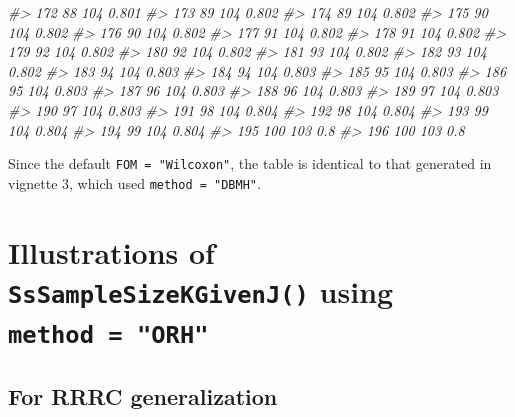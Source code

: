 \documentclass[
]{book}
\newenvironment{Shaded}{\begin{snugshade}}{\end{snugshade}}
\newcommand{\CommentTok}[1]{\textcolor[rgb]{0.56,0.35,0.01}{\textit{#1}}}
\begin{document}
\begin{Shaded}
\begin{Highlighting}[]
\CommentTok{\#\textgreater{} 172         88      104 0.801}
\CommentTok{\#\textgreater{} 173         89      104 0.802}
\CommentTok{\#\textgreater{} 174         89      104 0.802}
\CommentTok{\#\textgreater{} 175         90      104 0.802}
\CommentTok{\#\textgreater{} 176         90      104 0.802}
\CommentTok{\#\textgreater{} 177         91      104 0.802}
\CommentTok{\#\textgreater{} 178         91      104 0.802}
\CommentTok{\#\textgreater{} 179         92      104 0.802}
\CommentTok{\#\textgreater{} 180         92      104 0.802}
\CommentTok{\#\textgreater{} 181         93      104 0.802}
\CommentTok{\#\textgreater{} 182         93      104 0.802}
\CommentTok{\#\textgreater{} 183         94      104 0.803}
\CommentTok{\#\textgreater{} 184         94      104 0.803}
\CommentTok{\#\textgreater{} 185         95      104 0.803}
\CommentTok{\#\textgreater{} 186         95      104 0.803}
\CommentTok{\#\textgreater{} 187         96      104 0.803}
\CommentTok{\#\textgreater{} 188         96      104 0.803}
\CommentTok{\#\textgreater{} 189         97      104 0.803}
\CommentTok{\#\textgreater{} 190         97      104 0.803}
\CommentTok{\#\textgreater{} 191         98      104 0.804}
\CommentTok{\#\textgreater{} 192         98      104 0.804}
\CommentTok{\#\textgreater{} 193         99      104 0.804}
\CommentTok{\#\textgreater{} 194         99      104 0.804}
\CommentTok{\#\textgreater{} 195        100      103   0.8}
\CommentTok{\#\textgreater{} 196        100      103   0.8}
\end{Highlighting}
\end{Shaded}

Since the default \texttt{FOM\ =\ "Wilcoxon"}, the table is identical to that generated in vignette 3, which used \texttt{method\ =\ "DBMH"}.

\hypertarget{illustrations-of-sssamplesizekgivenj-using-method-orh}{%
\section{\texorpdfstring{Illustrations of \texttt{SsSampleSizeKGivenJ()} using \texttt{method\ =\ "ORH"}}{Illustrations of SsSampleSizeKGivenJ() using method = "ORH"}}\label{illustrations-of-sssamplesizekgivenj-using-method-orh}}

\hypertarget{for-rrrc-generalization}{%
\subsection{For RRRC generalization}\label{for-rrrc-generalization}}
\end{document}
